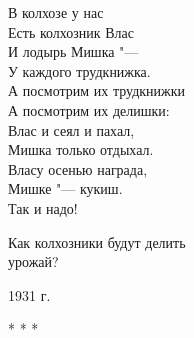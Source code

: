 \begin{center}
\begin{minipage}{0.4\textwidth}
\raggedright
В колхозе у нас \\
Есть колхозник Влас \\
И лодырь Мишка "--- \\
У каждого трудкнижка. \\
А посмотрим их трудкнижки \\
А посмотрим их делишки: \\
Влас и сеял и пахал, \\
Мишка только отдыхал. \\
Власу осенью награда, \\
Мишке "--- кукиш. \\
Так и надо!

\vspace{0.5cm}
Как колхозники будут делить \\
урожай?

\vspace{0.2cm}
\begin{flushright}
   1931 г. 
\end{flushright}
\end{minipage}
\end{center}

\begin{center}
* * *    
\end{center}
